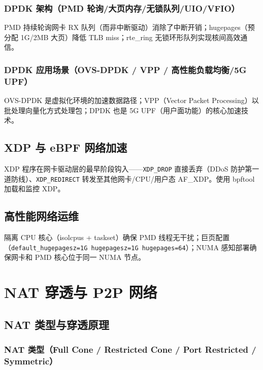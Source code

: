 \documentclass[12pt,UTF8]{ctexbook}
\begin{document}
    \subsection{DPDK 架构（PMD 轮询/大页内存/无锁队列/UIO/VFIO）}

PMD 持续轮询网卡 RX 队列（而非中断驱动）消除了中断开销；hugepages（预分配 1G/2MB 大页）降低 TLB miss；rte\_ring 无锁环形队列实现核间高效通信。

    \subsection{DPDK 应用场景（OVS-DPDK / VPP / 高性能负载均衡/5G UPF）}

OVS-DPDK 是虚拟化环境的加速数据路径；VPP（Vector Packet Processing）以批处理向量化方式处理包；DPDK 也是 5G UPF（用户面功能）的核心加速技术。

  \section{XDP 与 eBPF 网络加速}

XDP 程序在网卡驱动层的最早阶段钩入——\verb|XDP_DROP| 直接丢弃（DDoS 防护第一道防线）、\verb|XDP_REDIRECT| 转发至其他网卡/CPU/用户态 AF\_XDP。使用 bpftool 加载和监控 XDP。

  \section{高性能网络运维}

隔离 CPU 核心（isolcpus + taskset）确保 PMD 线程无干扰；巨页配置（\verb|default_hugepagesz=1G hugepagesz=1G hugepages=64|）；NUMA 感知部署确保网卡和 PMD 核心位于同一 NUMA 节点。


\chapter{NAT 穿透与 P2P 网络}
\label{chap:nat-p2p}

  \section{NAT 类型与穿透原理}
    \subsection{NAT 类型（Full Cone / Restricted Cone / Port Restricted / Symmetric）}
\end{document}
